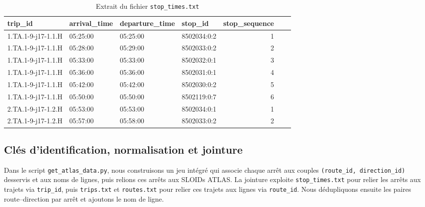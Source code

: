 \begin{itemize}
    \begin{table}[H]
    \caption{Extrait du fichier \texttt{stop\_times.txt}}
    \label{tab:stop_times}
    \centering
    \begin{tabular}{l l l l r l l}
    \toprule
    trip\_id & arrival\_time & departure\_time & stop\_id & stop\_sequence \\
    \midrule
    1.TA.1-9-j17-1.1.H & 05:25:00 & 05:25:00 & 8502034:0:2 & 1 \\
    1.TA.1-9-j17-1.1.H & 05:28:00 & 05:29:00 & 8502033:0:2 & 2 \\
    1.TA.1-9-j17-1.1.H & 05:33:00 & 05:33:00 & 8502032:0:1 & 3 \\
    1.TA.1-9-j17-1.1.H & 05:36:00 & 05:36:00 & 8502031:0:1 & 4 \\
    1.TA.1-9-j17-1.1.H & 05:42:00 & 05:42:00 & 8502030:0:2 & 5 \\
    1.TA.1-9-j17-1.1.H & 05:50:00 & 05:50:00 & 8502119:0:7 & 6 \\
    2.TA.1-9-j17-1.2.H & 05:53:00 & 05:53:00 & 8502034:0:1 & 1 \\
    2.TA.1-9-j17-1.2.H & 05:57:00 & 05:58:00 & 8502033:0:2 & 2 \\
    \bottomrule
    \end{tabular}
    \end{table}
\end{itemize}


\subsection{Clés d’identification, normalisation et jointure}

Dans le script \texttt{get\_atlas\_data.py}, nous construisons un jeu intégré qui associe chaque arrêt aux couples \texttt{(route\_id, direction\_id)} desservis et aux noms de lignes, puis relions ces arrêts aux SLOIDs ATLAS. La jointure exploite \texttt{stop\_times.txt} pour relier les arrêts aux trajets via \texttt{trip\_id}, puis \texttt{trips.txt} et \texttt{routes.txt} pour relier ces trajets aux lignes via \texttt{route\_id}. Nous dédupliquons ensuite les paires route–direction par arrêt et ajoutons le nom de ligne.


